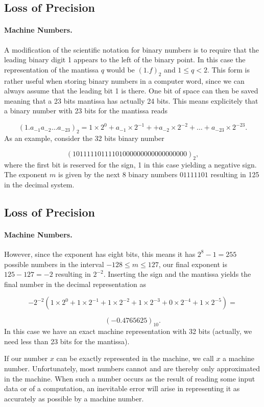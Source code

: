 \documentclass[%
twoside,                 %
final,                   %
10pt]{article}
\newenvironment{paragraphadmon}[1][]{\paragraph{#1}}{}
\begin{document}
\subsection{Loss of Precision}


\begin{paragraphadmon}[Machine Numbers.]
A modification of the scientific notation for binary numbers is to
require that the leading binary digit 1 appears to the left of the binary point.
In this case the representation of the mantissa $q$ would be
$(1.f)_2$ and $ 1 \le q < 2$. This form is rather useful when storing
binary numbers in a computer word, since we can always assume that the leading
bit 1 is there. One bit of space can then be saved meaning that a 23 bits
mantissa has actually 24 bits. This means explicitely that a binary number with 23 bits
for the mantissa reads

\begin{equation}
(1.a_{-1}a_{-2}\dots a_{-23})_2=1\times 2^0+a_{-1}\times 2^{-1}+
+a_{-2}\times 2^{-2}+\dots+a_{-23}\times 2^{-23}.
\end{equation}
As an example, consider the 32 bits binary number

\[
(10111110111101000000000000000000)_2,
\]
where the first bit is reserved for the sign, 1 in this case yielding a
negative sign. The exponent $m$ is given by the next 8 binary numbers
$01111101$ resulting in 125 in the decimal system.
\end{paragraphadmon}



\subsection{Loss of Precision}


\begin{paragraphadmon}[Machine Numbers.]
However, since the
exponent has eight bits, this means it has  $2^8-1=255$ possible numbers in the interval
$-128 \le m \le 127$, our final
exponent is $125-127=-2$ resulting in $2^{-2}$.
Inserting the sign and the mantissa yields the final number in the decimal representation as

\[
 -2^{-2}\left(1\times 2^0+1\times 2^{-1}+
1\times 2^{-2}+1\times 2^{-3}+0\times 2^{-4}+1\times 2^{-5}\right)=\]

\[
(-0.4765625)_{10}.
\]
In this case we have an exact machine representation with 32 bits (actually, we need less than
23 bits for the mantissa).

If our number $x$ can be exactly represented in the machine, we call
$x$ a machine number. Unfortunately, most numbers cannot  and are thereby
only approximated in the machine. When such a number occurs as the result
of reading some input data or of a computation, an inevitable error
will arise in representing it as accurately as possible by
a machine number.
\end{paragraphadmon}
\end{document}
